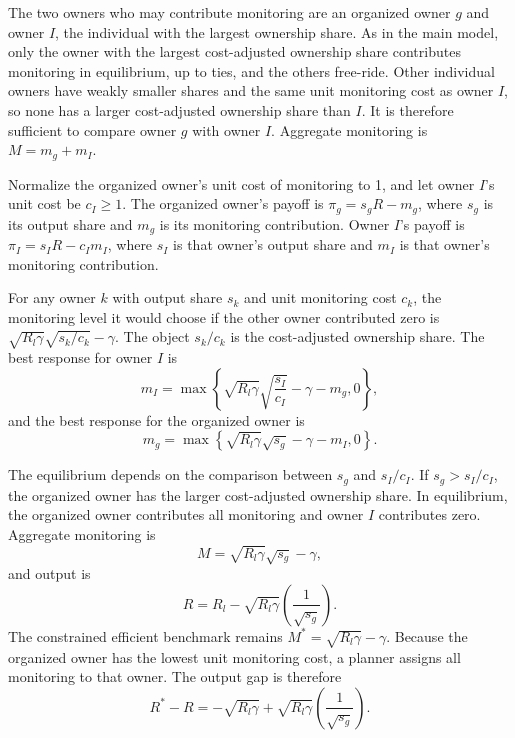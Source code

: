 \documentclass[12pt]{article}
\begin{document}
The two owners who may contribute monitoring are an organized owner $g$ and owner $I$, the individual with the largest ownership share. As in the main model, only the owner with the largest cost-adjusted ownership share contributes monitoring in equilibrium, up to ties, and the others free-ride. Other individual owners have weakly smaller shares and the same unit monitoring cost as owner $I$, so none has a larger cost-adjusted ownership share than $I$. It is therefore sufficient to compare owner $g$ with owner $I$. Aggregate monitoring is $M=m_g+m_I$.

Normalize the organized owner's unit cost of monitoring to 1, and let owner $I$'s unit cost be $c_I\geq 1$. The organized owner's payoff is $\pi_g=s_gR-m_g$, where $s_g$ is its output share and $m_g$ is its monitoring contribution. Owner $I$'s payoff is $\pi_I=s_I R-c_I m_I$, where $s_I$ is that owner's output share and $m_I$ is that owner's monitoring contribution.

For any owner $k$ with output share $s_k$ and unit monitoring cost $c_k$, the monitoring level it would choose if the other owner contributed zero is $\sqrt{R_l\gamma}\sqrt{s_k/c_k}-\gamma$. The object $s_k/c_k$ is the cost-adjusted ownership share. The best response for owner $I$ is
\begin{equation} \label{(11)}
    m_I = \max\left\{\sqrt{R_l \gamma}\sqrt{\frac{s_I}{c_I}} -\gamma-m_g,0\right\},
\end{equation}
\noindent
and the best response for the organized owner is
\begin{equation} \label{(12)}
    m_g = \max\left\{\sqrt{R_l \gamma}\sqrt{s_g}-\gamma-m_I,0\right\}.
\end{equation}

The equilibrium depends on the comparison between $s_g$ and $s_I/c_I$. If $s_g>s_I/c_I$, the organized owner has the larger cost-adjusted ownership share. In equilibrium, the organized owner contributes all monitoring and owner $I$ contributes zero. Aggregate monitoring is
\begin{equation} \label{(13)}
   M=\sqrt{R_l\gamma}\sqrt{s_g}-\gamma,
\end{equation}
\noindent
and output is
\begin{equation} \label{(14)}
   R=R_l -\sqrt{R_l\gamma} \left(\frac{1}{\sqrt{s_g}}\right).
\end{equation}
The constrained efficient benchmark remains $M^* = \sqrt{R_l \gamma} - \gamma$. Because the organized owner has the lowest unit monitoring cost, a planner assigns all monitoring to that owner. The output gap is therefore
\begin{equation} \label{(15)}
    R^*-R = -\sqrt{R_l\gamma}+\sqrt{R_l\gamma}\left(\frac{1}{\sqrt{s_g}}\right).
\end{equation}
\end{document}
